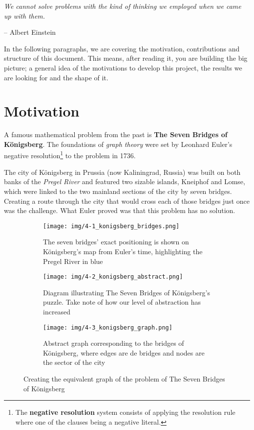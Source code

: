 \epigraph{\textit{We cannot solve problems with the kind of thinking we employed when we came up with them.}}{-- \textup{Albert Einstein}}

In the following paragraphs, we are covering the motivation, contributions and structure of this document. This means, after reading it, you are building the big picture; a general idea of the motivations to develop this project, the results we are looking for and the shape of it.

\section{Motivation}

A famous mathematical problem from the past is \textbf{The Seven Bridges of Königsberg}. The foundations of \textit{graph theory} were set by Leonhard Euler's negative resolution\footnote{The \textbf{negative resolution} system consists of applying the resolution rule where one of the clauses being a negative literal.} to the problem in 1736.

The city of Königsberg in Prussia (now Kaliningrad, Russia) was built on both banks of the \textit{Pregel River} and featured two sizable islands, Kneiphof and Lomse, which were linked to the two mainland sections of the city by seven bridges. Creating a route through the city that would cross each of those bridges just once was the challenge. What Euler proved was that this problem has no solution.

\begin{figure}[ht]
    \begin{subfigure}{.3\textwidth}
        \centering
        \texttt{[image: img/4-1\_konigsberg\_bridges.png]}
        \caption{The seven bridges' exact positioning is shown on Königsberg's map from Euler's time, highlighting the Pregel River in blue}
    \end{subfigure}%
    \hspace*{0.5em}
    \begin{subfigure}{.3\textwidth}
        \centering
        \texttt{[image: img/4-2\_konigsberg\_abstract.png]}
        \caption{Diagram illustrating The Seven Bridges of Königsberg's puzzle. Take note of how our level of abstraction has increased}
    \end{subfigure}%
    \hspace*{0.5em}
    \begin{subfigure}{.3\textwidth}
        \centering
        \texttt{[image: img/4-3\_konigsberg\_graph.png]}
        \caption{Abstract graph corresponding to the bridges of Königsberg, where edges are de bridges and nodes are the sector of the city}
    \end{subfigure}%
    \caption[Creating the equivalent graph of the problem of The Seven Bridges of Königsberg]{Creating the equivalent graph of the problem of The Seven Bridges of Königsberg\footnotemark}
\end{figure}

